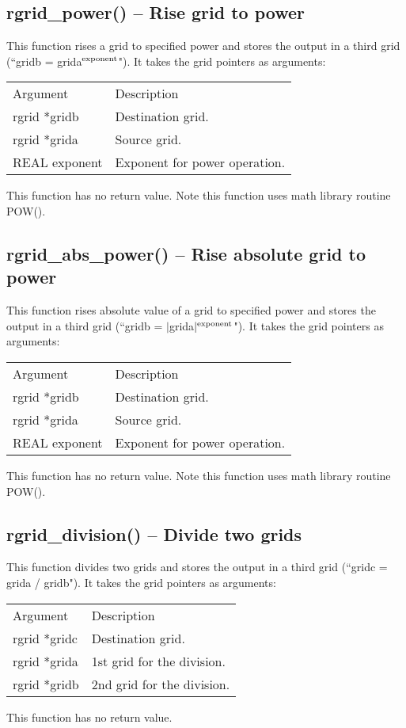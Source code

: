 \documentclass[12pt,letterpaper]{report}
\begin{document}
\subsection{rgrid\_power() -- Rise grid to power}

This function rises a grid to specified power and stores the output in a third grid (``gridb = grida$^\textnormal{exponent}$"). It takes the grid pointers as arguments:
\begin{longtable}{p{} p{}}
Argument & Description\\
\cline{1-2}
rgrid *gridb & Destination grid.\\
rgrid *grida & Source grid.\\
REAL exponent & Exponent for power operation.\\
\end{longtable}
\noindent
This function has no return value. Note this function uses math library routine POW().

\subsection{rgrid\_abs\_power() -- Rise absolute grid to power}

This function rises absolute value of a grid to specified power and stores the output in a third grid (``gridb = $|$grida$|^\textnormal{exponent}$"). It takes the grid pointers as arguments:
\begin{longtable}{p{} p{}}
Argument & Description\\
\cline{1-2}
rgrid *gridb & Destination grid.\\
rgrid *grida & Source grid.\\
REAL exponent & Exponent for power operation.\\
\end{longtable}
\noindent
This function has no return value. Note this function uses math library routine POW().

 \subsection{rgrid\_division() -- Divide two grids}

This function divides two grids and stores the output in a third grid (``gridc = grida / gridb"). It takes the grid pointers as arguments:
\begin{longtable}{p{} p{}}
Argument & Description\\
\cline{1-2}
rgrid *gridc & Destination grid.\\
rgrid *grida & 1st grid for the division.\\
rgrid *gridb & 2nd grid for the division.\\
\end{longtable}
\noindent
This function has no return value.
\end{document}
